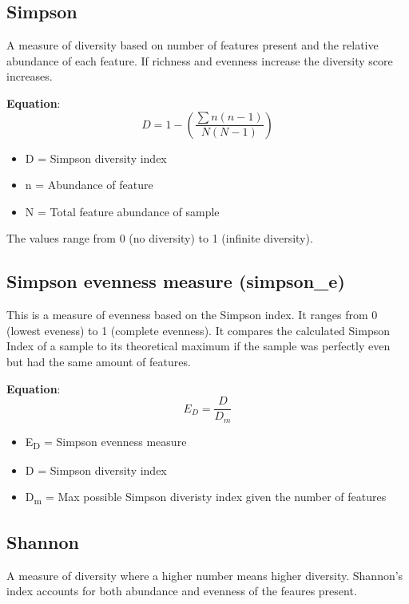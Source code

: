 \documentclass[
]{book}
\providecommand{\tightlist}{%
  \setlength{\itemsep}{0pt}\setlength{\parskip}{0pt}}
\begin{document}
\hypertarget{simpson}{%
\subsection{Simpson}\label{simpson}}

A measure of diversity based on number of features present and the relative abundance of each feature. If richness and evenness increase the diversity score increases.

\textbf{Equation}:
\[
D = 1 - 
{(
\frac
{\sum n{(n-1)}}
{N{(N-1)}}
)}
\]

\begin{itemize}
\tightlist
\item
  D = Simpson diversity index
\item
  n = Abundance of feature
\item
  N = Total feature abundance of sample
\end{itemize}

The values range from 0 (no diversity) to 1 (infinite diversity).

\hypertarget{simpsone}{%
\subsection{Simpson evenness measure (simpson\_e)}\label{simpsone}}

This is a measure of evenness based on the Simpson index. It ranges from 0 (lowest eveness) to 1 (complete evenness). It compares the calculated Simpson Index of a sample to its theoretical maximum if the sample was perfectly even but had the same amount of features.

\textbf{Equation}:
\[
E_D = 
\frac{D}
{D_m}
\]

\begin{itemize}
\tightlist
\item
  E\textsubscript{D} = Simpson evenness measure
\item
  D = Simpson diversity index
\item
  D\textsubscript{m} = Max possible Simpson diveristy index given the number of features
\end{itemize}

\hypertarget{shannon}{%
\subsection{Shannon}\label{shannon}}

A measure of diversity where a higher number means higher diversity. Shannon's index accounts for both abundance and evenness of the feaures present.
\end{document}
